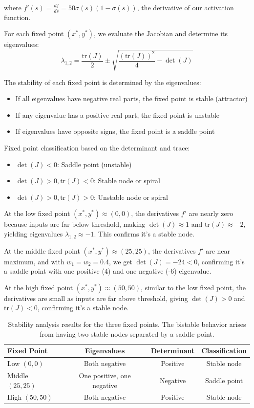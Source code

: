 \documentclass{article}
\begin{document}
where $f'(s) = \frac{df}{ds} = 50\sigma(s)(1 - \sigma(s))$, the derivative of our activation function.

For each fixed point $(x^*,y^*)$, we evaluate the Jacobian and determine its eigenvalues:
\[
\lambda_{1,2} = \frac{\text{tr}(J)}{2} \pm \sqrt{\frac{(\text{tr}(J))^2}{4} - \det(J)}
\]

The stability of each fixed point is determined by the eigenvalues:
\begin{itemize}
    \item If all eigenvalues have negative real parts, the fixed point is stable (attractor)
    \item If any eigenvalue has a positive real part, the fixed point is unstable
    \item If eigenvalues have opposite signs, the fixed point is a saddle point
\end{itemize}

Fixed point classification based on the determinant and trace:
\begin{itemize}
    \item $\det(J) < 0$: Saddle point (unstable)
    \item $\det(J) > 0, \text{tr}(J) < 0$: Stable node or spiral
    \item $\det(J) > 0, \text{tr}(J) > 0$: Unstable node or spiral
\end{itemize}

At the low fixed point $(x^*,y^*) \approx (0,0)$, the derivatives $f'$ are nearly zero because inputs are far below threshold, making $\det(J) \approx 1$ and $\text{tr}(J) \approx -2$, yielding eigenvalues $\lambda_{1,2} \approx -1$. This confirms it's a stable node.

At the middle fixed point $(x^*,y^*) \approx (25,25)$, the derivatives $f'$ are near maximum, and with $w_1=w_2=0.4$, we get $\det(J) = -24 < 0$, confirming it's a saddle point with one positive (4) and one negative (-6) eigenvalue.

At the high fixed point $(x^*,y^*) \approx (50,50)$, similar to the low fixed point, the derivatives are small as inputs are far above threshold, giving $\det(J) > 0$ and $\text{tr}(J) < 0$, confirming it's a stable node.

\begin{table}[H]
\centering
\begin{tabular}{@{}lccc@{}}
\toprule
\textbf{Fixed Point} & \textbf{Eigenvalues} & \textbf{Determinant} & \textbf{Classification} \\
\midrule
Low $(0,0)$ & Both negative & Positive & Stable node \\
Middle $(25,25)$ & One positive, one negative & Negative & Saddle point \\
High $(50,50)$ & Both negative & Positive & Stable node \\
\bottomrule
\end{tabular}
\caption{Stability analysis results for the three fixed points. The bistable behavior arises from having two stable nodes separated by a saddle point.}
\label{tab:stability}
\end{table}
\end{document}
